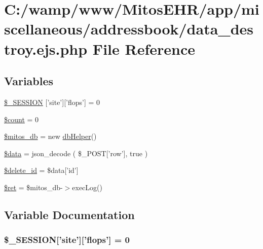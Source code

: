 \hypertarget{miscellaneous_2addressbook_2data__destroy_8ejs_8php}{\section{\-C\-:/wamp/www/\-Mitos\-E\-H\-R/app/miscellaneous/addressbook/data\-\_\-destroy.ejs.\-php \-File \-Reference}
\label{miscellaneous_2addressbook_2data__destroy_8ejs_8php}
}
\subsection*{\-Variables}
\begin{DoxyCompactItemize}
\item 
\hyperlink{miscellaneous_2addressbook_2data__destroy_8ejs_8php_a99fda8552a3e58235643b79f5af3ded8}{\$\-\_\-\-S\-E\-S\-S\-I\-O\-N} \mbox{[}'site'\mbox{]}\mbox{[}'flops'\mbox{]} = 0
\item 
\hyperlink{miscellaneous_2addressbook_2data__destroy_8ejs_8php_af789423037bbc89dc7c850e761177570}{\$count} = 0
\item 
\hyperlink{miscellaneous_2addressbook_2data__destroy_8ejs_8php_ab5d961f93efe4e2e8d8374f01dd6c65a}{\$mitos\-\_\-db} = new \hyperlink{classdb_helper}{db\-Helper}()
\item 
\hyperlink{miscellaneous_2addressbook_2data__destroy_8ejs_8php_a6efc15b5a2314dd4b5aaa556a375c6d6}{\$data} = json\-\_\-decode ( \$\-\_\-\-P\-O\-S\-T\mbox{[}'row'\mbox{]}, true )
\item 
\hyperlink{miscellaneous_2addressbook_2data__destroy_8ejs_8php_a932840e24cb4db95716f8f5c96f22051}{\$delete\-\_\-id} = \$data\mbox{[}'id'\mbox{]}
\item 
\hyperlink{miscellaneous_2addressbook_2data__destroy_8ejs_8php_affd9e3eb0aad0a7ca42912cd925f148c}{\$ret} = \$mitos\-\_\-db-\/$>$exec\-Log()
\end{DoxyCompactItemize}


\subsection{\-Variable \-Documentation}
\hypertarget{miscellaneous_2addressbook_2data__destroy_8ejs_8php_a99fda8552a3e58235643b79f5af3ded8}{
\subsubsection[{\$\-\_\-\-S\-E\-S\-S\-I\-O\-N}]{\setlength{\rightskip}{0pt plus 5cm}\$\-\_\-\-S\-E\-S\-S\-I\-O\-N\mbox{[}'site'\mbox{]}\mbox{[}'flops'\mbox{]} = 0}}\label{miscellaneous_2addressbook_2data__destroy_8ejs_8php_a99fda8552a3e58235643b79f5af3ded8}


